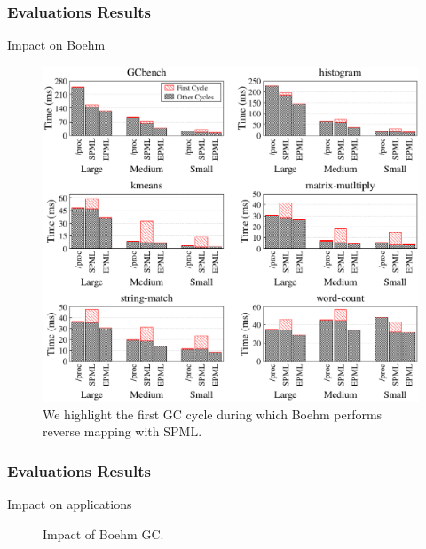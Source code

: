 \documentclass[xcolor=table,bigger,unknownkeysallowed]{beamer}
\begin{document}
        \begin{frame}
			\thispagestyle{empty}
            \frametitle{Evaluations Results}
			\begin{block}{Impact on Boehm}
				\begin{figure}[!h]
					\centering 
					\includegraphics[width=.5\linewidth]{fig/boehm-results-tracker}		
					\caption{\scriptsize We highlight the first GC cycle during which Boehm performs reverse mapping with SPML.}
					\label{fig:boehm-results-tracker}
				\end{figure}											
			\end{block}
        \end{frame}
        \begin{frame}
			\frametitle{Evaluations Results}
			\begin{block}{Impact on applications}
				\begin{figure}[!htp]
					\centering 
					\caption{\small Impact of Boehm GC.}
					\label{fig:boehm-results-tracked}
				\end{figure}											
			\end{block}
        \end{frame}      
\end{document}
